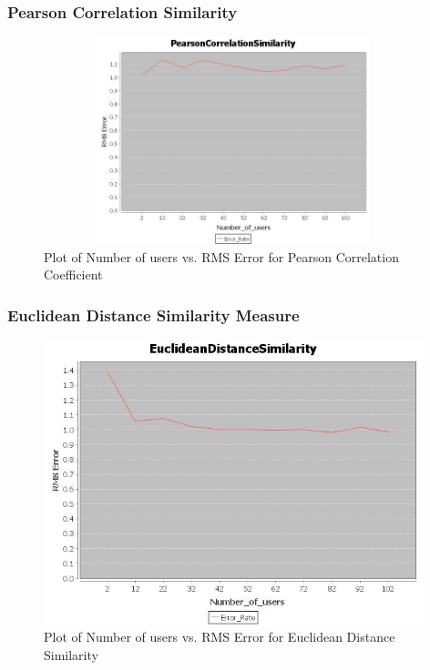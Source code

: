 \documentclass{article}
\begin{document}
\subsubsection{Pearson Correlation Similarity}
\begin{figure}[h!tb]
\centering
\includegraphics[height=6cm,width=11cm]{1.jpg}
\caption {Plot of Number of users vs. RMS Error for Pearson Correlation Coefficient}
\end{figure}
\newpage
\subsubsection{Euclidean Distance Similarity Measure}
\begin{figure}[h!tb]
\centering
\includegraphics[width=11cm]{2.jpg}
\caption {Plot of Number of users vs. RMS Error for Euclidean Distance Similarity}
\end{figure}
\end{document}
